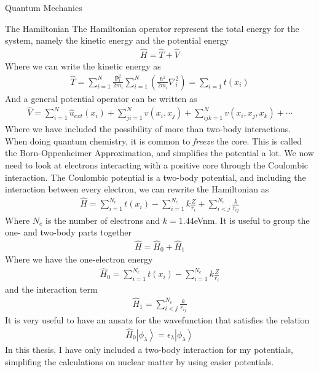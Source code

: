 \documentclass[twoside,english]{uiofysmaster}
\begin{document}
\begin{chapter}{Quantum Mechanics}
 	\begin{section}{The Hamiltonian}
 		The Hamiltonian operator represent the total energy for the system, namely the kinetic energy and the potential energy
 		\begin{align}
 			\hat H = \hat T + \hat V
 		\end{align}
 		Where we can write the kinetic energy as \cite{MHJSlides}
 		\begin{align}
 			\hat T = \sum_{i=1}^N \frac{ \mathbf{p}_i^2}{2m_i} \sum_{i=1}^N \left( \frac{\hbar^2}{2m_i} \nabla_i^2 \right) = \sum_{i=1} t(x_i)
 		\end{align}
 		And a general potential operator can be written as
 		\begin{align}
 			\hat V = \sum_{i=1}^N \hat u_{ext}(x_i) + \sum_{ji = 1}^N v(x_i,x_j) + \sum_{ijk=1}^N v(x_i,x_j,x_k) + \cdots 
 		\end{align}
 		Where we have included the possibility of more than two-body interactions. When doing quantum chemistry, it is common to \textit{freeze} the core. This is called the Born-Oppenheimer Approximation, and simplifies the potential a lot. We now need to look at electrons interacting with a positive core through the Coulombic interaction. The Coulombic potential is a two-body potential, and including the interaction between every electron, we can rewrite the Hamiltonian as
 		\begin{align}
 			\hat H = \sum_{i=1}^{N_e} t(x_i) - \sum_{i=1}^{N_e} k \frac{Z}{r_i} + \sum_{i<j}^{N_e} \frac{k}{r_{ij}}
 		\end{align}
 		Where $N_e$ is the number of electrons and $k = 1.44$eVnm. It is useful to group the one- and two-body parts together
 		\begin{align}
 			\hat H = \hat H_0 + \hat H_1
 		\end{align}
 		Where we have the one-electron energy
 		\begin{align}
 			\hat H_0 = \sum_{i=1}^{N_e} t(x_i) - \sum_{i=1}^{N_e} k \frac{Z}{r_i}
 		\end{align}
 		and the interaction term
 		\begin{align}
 			\hat H_1 = \sum_{i<j}^{N_e} \frac{k}{r_{ij}}
 		\end{align}
 		It is very useful to have an ansatz for the wavefunction that satisfies the relation
 		\begin{align}
 			\hat H_0 \left| \phi_\lambda \right> = \epsilon_\lambda \left| \phi_\lambda \right>
 		\end{align}
 		In this thesis, I have only included a two-body interaction for my potentials, simplifing the calculations on nuclear matter by using easier potentials. 
 	\end{section}


\end{chapter}
\end{document}
